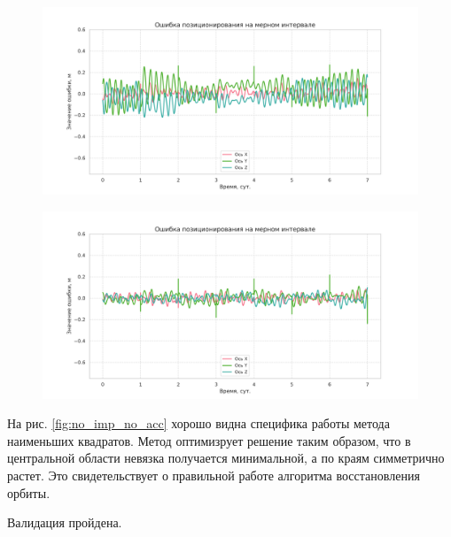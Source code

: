 \begin{figure}[h!]
   \centering
   \includegraphics[width=\linewidth]{../images/solution/lageos/no_imp_with_acc.png}
   \label{fig:no_imp_with_acc}
\end{figure}

\begin{figure}[h!]
   \centering
   \includegraphics[width=\linewidth]{../images/solution/lageos/with_imp_with_acc.png}
   \label{fig:with_imp_with_acc}
\end{figure}

На рис. \ref{fig:no_imp_no_acc} хорошо видна специфика работы метода наименьших квадратов.
Метод оптимизрует решение таким образом, что в центральной области невязка получается
минимальной, а по краям симметрично растет. Это свидетельствует о правильной работе
алгоритма восстановления орбиты.

Валидация пройдена.
